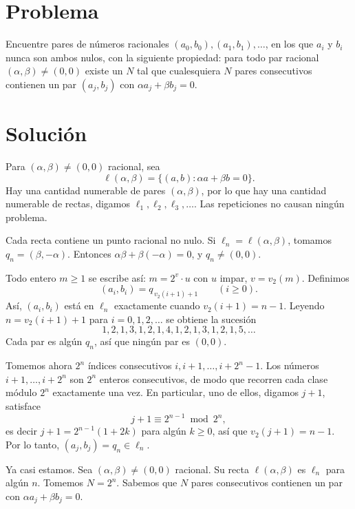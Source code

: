 \documentclass[11pt]{amsproc}
\begin{document}
\section*{Problema} 

Encuentre pares de números racionales
$(a_0,b_0),(a_1,b_1),\dots$, en los que $a_i$ y $b_i$ nunca son ambos nulos,
con la siguiente propiedad: para todo par racional $(\alpha,\beta)\neq(0,0)$
existe un $N$ tal que cualesquiera $N$ pares consecutivos contienen un par
$(a_j,b_j)$ con $\alpha a_j+\beta b_j=0$.

\section*{Solución} 

Para $(\alpha,\beta)\neq(0,0)$
racional, sea
\[
  \ell(\alpha,\beta)=\{(a,b):\alpha a+\beta b=0\}.
\]
Hay una cantidad numerable de pares $(\alpha,\beta)$, por lo que hay una
cantidad numerable de rectas, digamos 
$\ell_1,\ell_2,\ell_3,\dots$. Las repeticiones no causan ningún problema. 

Cada recta contiene un punto racional no nulo. Si
$\ell_n=\ell(\alpha,\beta)$, tomamos $q_n=(\beta,-\alpha)$. Entonces
$\alpha\beta+\beta(-\alpha)=0$, y $q_n\neq(0,0)$.

Todo entero $m\geq1$ se escribe
así: $m=2^v\cdot u$ con $u$ impar, $v=v_2(m)$.
Definimos
\[
  (a_i,b_i)=q_{\,v_2(i+1)+1}\qquad(i\geq0).
\]
Así, $(a_i,b_i)$ está en $\ell_n$ exactamente cuando $v_2(i+1)=n-1$. Leyendo
$n=v_2(i+1)+1$ para $i=0,1,2,\dots$ se obtiene la sucesión 
\[
  1,2,1,3,1,2,1,4,1,2,1,3,1,2,1,5,\dots
\]
Cada par es algún $q_n$, así que ningún par es $(0,0)$.

Tomemos ahora $2^n$ índices consecutivos $i,i+1,\dots,i+2^n-1$. Los números
$i+1,\dots,i+2^n$ son $2^n$ enteros consecutivos, de modo que recorren cada
clase módulo $2^n$ exactamente una vez. En particular, uno de
ellos, digamos $j+1$, satisface
\[
  j+1\equiv 2^{n-1}\bmod{2^n}, 
\]
es decir $j+1=2^{n-1}(1+2k)$ para algún $k\ge 0$, así que $v_2(j+1)=n-1$. Por
lo tanto, $(a_j,b_j)=q_n\in\ell_n$.

Ya casi estamos. Sea $(\alpha,\beta)\neq(0,0)$ racional.
Su recta $\ell(\alpha,\beta)$ es $\ell_n$ para algún $n$. Tomemos $N=2^n$.
Sabemos que $N$ pares consecutivos contienen un par con
$\alpha a_j+\beta b_j=0$. 
\end{document}
